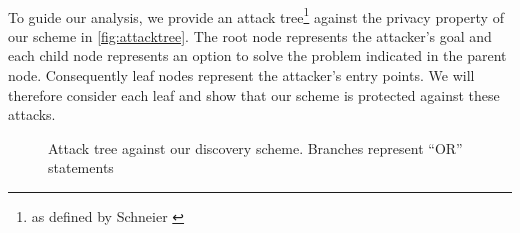 	
	\paragraph{} To guide our analysis, we provide an attack tree\footnote{as defined by Schneier \cite{attacktree}} against the privacy property of our scheme in \autoref{fig:attacktree}. The root node represents the attacker's goal and each child node represents an option to solve the problem indicated in the parent node. Consequently leaf nodes represent the attacker's entry points. We will therefore consider each leaf and show that our scheme is protected against these attacks.
	
	
		\begin{figure}[H]
			\begin{center}
				
				\caption{Attack tree against our discovery scheme. Branches represent ``OR'' statements}
				\label{fig:attacktree}
			\end{center}
		\end{figure}

	
	
		
		
		
